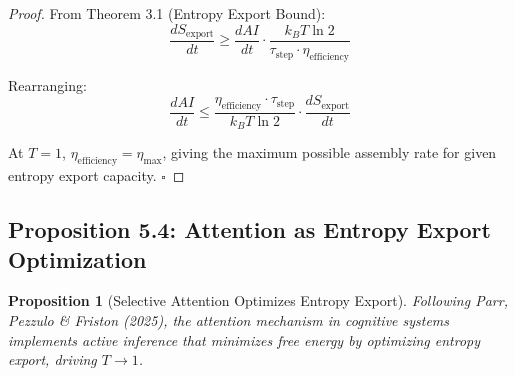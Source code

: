 \documentclass[11pt,a4paper]{article}
\newtheorem{proposition}[theorem]{Proposition}
\begin{document}
\begin{proof}
From Theorem 3.1 (Entropy Export Bound):
\begin{equation}
\frac{dS_{\text{export}}}{dt} \geq \frac{dAI}{dt} \cdot \frac{k_B T \ln 2}{\tau_{\text{step}} \cdot \eta_{\text{efficiency}}}
\end{equation}

Rearranging:
\begin{equation}
\frac{dAI}{dt} \leq \frac{\eta_{\text{efficiency}} \cdot \tau_{\text{step}}}{k_B T \ln 2} \cdot \frac{dS_{\text{export}}}{dt}
\end{equation}

At $T = 1$, $\eta_{\text{efficiency}} = \eta_{\max}$, giving the maximum possible assembly rate for given entropy export capacity.
\hfill $\square$
\end{proof}

\subsection{Proposition 5.4: Attention as Entropy Export Optimization}

\begin{proposition}[Selective Attention Optimizes Entropy Export]
Following Parr, Pezzulo \& Friston (2025), the attention mechanism in cognitive systems implements active inference that minimizes free energy by optimizing entropy export, driving $T \to 1$.
\end{proposition}
\end{document}
